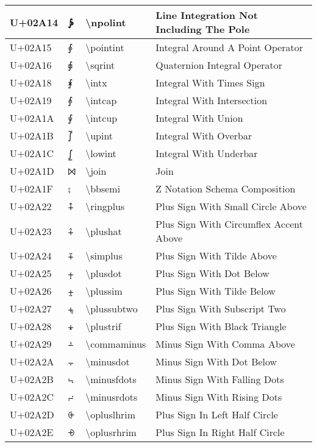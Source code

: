 \begin{table}[h]
\begin{tabulary}{\linewidth}{|L|L|L|L|}
U+02A14 & ⨔ & {\textbackslash}npolint & Line Integration Not Including The Pole \\
\hline
U+02A15 & ⨕ & {\textbackslash}pointint & Integral Around A Point Operator \\
\hline
U+02A16 & ⨖ & {\textbackslash}sqrint & Quaternion Integral Operator \\
\hline
U+02A18 & ⨘ & {\textbackslash}intx & Integral With Times Sign \\
\hline
U+02A19 & ⨙ & {\textbackslash}intcap & Integral With Intersection \\
\hline
U+02A1A & ⨚ & {\textbackslash}intcup & Integral With Union \\
\hline
U+02A1B & ⨛ & {\textbackslash}upint & Integral With Overbar \\
\hline
U+02A1C & ⨜ & {\textbackslash}lowint & Integral With Underbar \\
\hline
U+02A1D & ⨝ & {\textbackslash}join & Join \\
\hline
U+02A1F & ⨟ & {\textbackslash}bbsemi & Z Notation Schema Composition \\
\hline
U+02A22 & ⨢ & {\textbackslash}ringplus & Plus Sign With Small Circle Above \\
\hline
U+02A23 & ⨣ & {\textbackslash}plushat & Plus Sign With Circumflex Accent Above \\
\hline
U+02A24 & ⨤ & {\textbackslash}simplus & Plus Sign With Tilde Above \\
\hline
U+02A25 & ⨥ & {\textbackslash}plusdot & Plus Sign With Dot Below \\
\hline
U+02A26 & ⨦ & {\textbackslash}plussim & Plus Sign With Tilde Below \\
\hline
U+02A27 & ⨧ & {\textbackslash}plussubtwo & Plus Sign With Subscript Two \\
\hline
U+02A28 & ⨨ & {\textbackslash}plustrif & Plus Sign With Black Triangle \\
\hline
U+02A29 & ⨩ & {\textbackslash}commaminus & Minus Sign With Comma Above \\
\hline
U+02A2A & ⨪ & {\textbackslash}minusdot & Minus Sign With Dot Below \\
\hline
U+02A2B & ⨫ & {\textbackslash}minusfdots & Minus Sign With Falling Dots \\
\hline
U+02A2C & ⨬ & {\textbackslash}minusrdots & Minus Sign With Rising Dots \\
\hline
U+02A2D & ⨭ & {\textbackslash}opluslhrim & Plus Sign In Left Half Circle \\
\hline
U+02A2E & ⨮ & {\textbackslash}oplusrhrim & Plus Sign In Right Half Circle \\

\end{tabulary}
\end{table}
